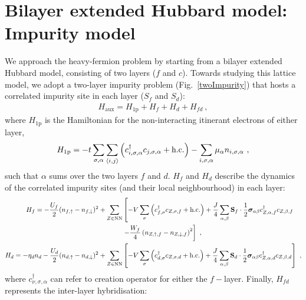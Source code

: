 \section{Bilayer extended Hubbard model: Impurity model}
We approach the heavy-fermion problem by starting from a bilayer extended Hubbard model, consisting of two layers (\(f\) and \(c\)). Towards studying this lattice model, we adopt a two-layer impurity problem (Fig.~\ref{twoImpurity}) that hosts a correlated impurity site in each layer (\(S_f\) and \(S_d\)):
\begin{equation}\begin{aligned}
	H_\text{aux} = H_\text{1p} + H_f + H_d + H_{fd}~,
\end{aligned}\end{equation}
where \(H_\text{1p}\) is  the Hamiltonian for the non-interacting itinerant electrons of either layer,
\begin{equation}\begin{aligned}
	H_\text{1p} = -t\sum_{\sigma,\alpha}\sum_{\braket{i,j}}\left(c^\dagger_{i,\sigma,\alpha}c_{j,\sigma,\alpha} + \text{h.c.}\right) - \sum_{i,\sigma,\alpha}\mu_\alpha n_{i,\sigma,\alpha}~,
\end{aligned}\end{equation}
such that \(\alpha\) sums over the two layers \(f\) and \(d\). \(H_f\) and \(H_d\) describe the dynamics of the correlated impurity sites (and their local neighbourhood) in each layer:
\begin{equation}\begin{aligned}
	H_f = -\frac{U_f}{2} (n_{f,\uparrow} - n_{f,\downarrow})^2 + \sum_{Z \in \text{NN}}&\left[-V\sum_{\sigma}\left(c^\dagger_{f,\sigma} c_{Z,\sigma,f} + \text{h.c.}\right) + \frac{J}{4}\sum_{\alpha,\beta}{\bf S}_f \cdot \frac{1}{2}{\boldsymbol{\sigma}}_{\alpha\beta}c^\dagger_{Z,\alpha,f}c_{Z,\beta,f} \right.\\
		 &\left.- \frac{W_f}{4} \left(n_{Z,\uparrow,f} - n_{Z,\downarrow,f}\right)^2\right] ~,\\
	H_d = -\eta_d n_{d} - \frac{U_d}{2}(n_{d,\uparrow} - n_{d,\downarrow})^2 + \sum_{Z \in \text{NN}}&\left[-V\sum_{\sigma}\left(c^\dagger_{d,\sigma} c_{Z,\sigma,d} + \text{h.c.}\right) + \frac{J}{4}\sum_{\alpha,\beta}{\bf S}_d \cdot \frac{1}{2}{\boldsymbol{\sigma}}_{\alpha\beta}c^\dagger_{Z,\alpha,d}c_{Z,\beta,d}\right] ~,
\end{aligned}\end{equation}
where \(c^\dagger_{\nu,\sigma,\alpha}\) can refer to creation operator for either the \(f-\)layer. Finally, \(H_{fd}\) represents the inter-layer hybridisation:
